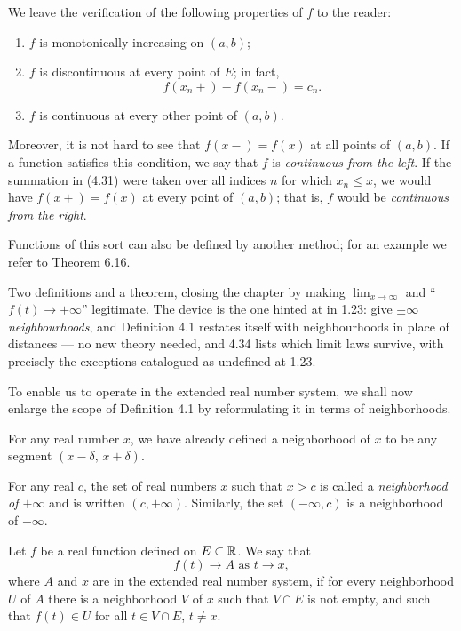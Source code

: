 We leave the verification of the following properties of $f$ to the reader:
\begin{enumerate}[label=(\alph*), leftmargin=2.2em, itemsep=1pt, topsep=3pt]
  \item $f$ is monotonically increasing on $(a,b)$;
  \item $f$ is discontinuous at every point of $E$; in fact,
        \[ f(x_n+) - f(x_n-) = c_n. \]
  \item $f$ is continuous at every other point of $(a,b)$.
\end{enumerate}
Moreover, it is not hard to see that $f(x-) = f(x)$ at all points of $(a,b)$.
If a function satisfies this condition, we say that $f$ is \emph{continuous
from the left}. If the summation in (4.31) were taken over all indices $n$
for which $x_n \le x$, we would have $f(x+) = f(x)$ at every point of
$(a,b)$; that is, $f$ would be \emph{continuous from the right}.

Functions of this sort can also be defined by another method; for an example
we refer to Theorem 6.16.


\begin{signpost}
Two definitions and a theorem, closing the chapter by making
$\lim_{x\to\infty}$ and ``$f(t) \to +\infty$'' legitimate. The device is the
one hinted at in 1.23: give $\pm\infty$ \emph{neighbourhoods}, and Definition
4.1 restates itself with neighbourhoods in place of distances --- no new
theory needed, and 4.34 lists which limit laws survive, with precisely the
exceptions catalogued as undefined at 1.23.
\end{signpost}

\noindent
To enable us to operate in the extended real number system, we shall now
enlarge the scope of Definition 4.1 by reformulating it in terms of
neighborhoods.

For any real number $x$, we have already defined a neighborhood of $x$ to be
any segment $(x-\delta,\,x+\delta)$.

For any real $c$, the set of real numbers $x$ such that $x > c$ is called a
\emph{neighborhood of $+\infty$} and is written $(c,+\infty)$. Similarly, the
set $(-\infty,c)$ is a neighborhood of $-\infty$.

Let $f$ be a real function defined on $E \subset \mathbb{R}$. We say that
\[ f(t) \to A \text{ as } t \to x, \]
where $A$ and $x$ are in the extended real number system, if for every
neighborhood $U$ of $A$ there is a neighborhood $V$ of $x$ such that
$V \cap E$ is not empty, and such that $f(t) \in U$ for all
$t \in V \cap E$, $t \ne x$.

